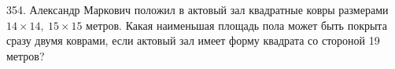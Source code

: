 354. Александр Маркович положил в актовый зал квадратные ковры размерами $14 \times 14,\ 15 \times 15$ метров. Какая наименьшая площадь пола может быть покрыта сразу двумя коврами, если актовый зал имеет форму квадрата со стороной 19 метров?\\
